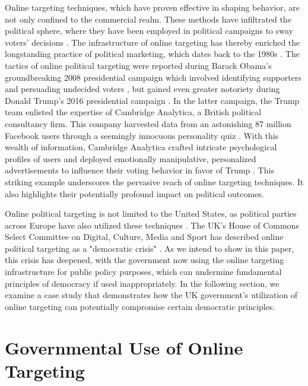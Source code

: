 \documentclass[preprint]{acmart}
\begin{document}
Online targeting techniques, which have proven effective in shaping behavior, are not only confined to the commercial realm. These methods have infiltrated the political sphere, where they have been employed in political campaigns to sway voters' decisions \cite{crain2019, dommett}. The infrastructure of online targeting has thereby enriched the longstanding practice of political marketing, which dates back to the 1980s \cite{wring}. The tactics of online political targeting were reported during Barack Obama's groundbreaking 2008 presidential campaign which involved identifying supporters and persuading undecided voters \cite{plouffe2010,farman}, but gained even greater notoriety during Donald Trump's 2016 presidential campaign \cite{Bomelburg2021, bakir}. In the latter campaign, the Trump team enlisted the expertise of Cambridge Analytica, a British political consultancy firm. This company harvested data from an astonishing 87 million Facebook users through a seemingly innocuous personality quiz \cite{schneble2018}. With this wealth of information, Cambridge Analytica crafted intricate psychological profiles of users and deployed emotionally manipulative, personalized advertisements to influence their voting behavior in favor of Trump \cite{Bomelburg2021, bakir}. This striking example underscores the pervasive reach of online targeting techniques. It also highlights their potentially profound impact on political outcomes.



Online political targeting is not limited to the United States, as political parties across Europe have also utilized these techniques \cite{zuiderveen2018}. The UK's House of Commons Select Committee on Digital, Culture, Media and Sport has described online political targeting as a "democratic crisis" \cite[p.51]{dsmc2018}. As we intend to show in this paper, this crisis has deepened, with the government now using the online targeting infrastructure for public policy purposes, which can undermine fundamental principles of democracy if used inappropriately. In the following section, we examine a case study that demonstrates how the UK government's utilization of online targeting can potentially compromise certain democratic principles.



\section{Governmental Use of Online Targeting}
\end{document}

